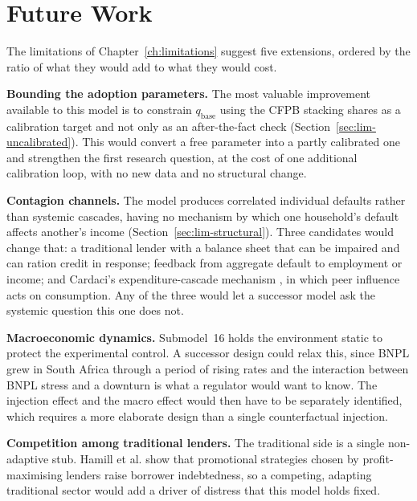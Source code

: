 
\section{Future Work}
\label{sec:future-work}

The limitations of Chapter~\ref{ch:limitations} suggest five extensions, ordered by the ratio of
what they would add to what they would cost.

\textbf{Bounding the adoption parameters.} The most valuable improvement available to this model is
to constrain $q_{\text{base}}$ using the \ac{CFPB} stacking shares as a calibration target and not
only as an after-the-fact check (Section~\ref{sec:lim-uncalibrated}). This would convert a free
parameter into a partly calibrated one and strengthen the first research question, at the cost of
one additional calibration loop, with no new data and no structural change.

\textbf{Contagion channels.} The model produces correlated individual defaults rather than systemic
cascades, having no mechanism by which one household's default affects another's income
(Section~\ref{sec:lim-structural}). Three candidates would change that: a traditional lender with a
balance sheet that can be impaired and can ration credit in response; feedback from aggregate
default to employment or income; and Cardaci's expenditure-cascade mechanism
\cite{cardaci2018inequality}, in which peer influence acts on consumption. Any of the three would
let a successor model ask the systemic question this one does not.

\textbf{Macroeconomic dynamics.} Submodel~16 holds the environment static to protect the
experimental control. A successor design could relax this, since \ac{BNPL} grew in South Africa
through a period of rising rates and the interaction between \ac{BNPL} stress and a downturn is
what a regulator would want to know. The injection effect and the macro effect would then have to
be separately identified, which requires a more elaborate design than a single counterfactual
injection.

\textbf{Competition among traditional lenders.} The traditional side is a single non-adaptive stub.
Hamill et al. \cite{hamill2023creditcard} show that promotional strategies chosen by
profit-maximising lenders raise borrower indebtedness, so a competing, adapting traditional sector
would add a driver of distress that this model holds fixed.

